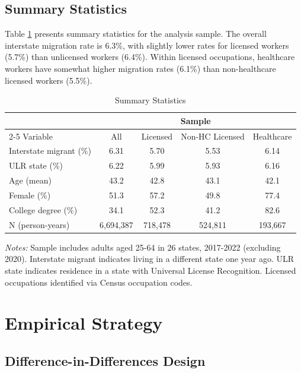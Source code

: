 \documentclass[12pt]{article}
\begin{document}
\subsection{Summary Statistics}

Table \ref{tab:summary} presents summary statistics for the analysis sample. The overall interstate migration rate is 6.3\%, with slightly lower rates for licensed workers (5.7\%) than unlicensed workers (6.4\%). Within licensed occupations, healthcare workers have somewhat higher migration rates (6.1\%) than non-healthcare licensed workers (5.5\%).

\begin{table}[H]
\centering
\caption{Summary Statistics}
\begin{tabular}{lcccc}
\toprule
& \multicolumn{4}{c}{Sample} \\
\cmidrule(lr){2-5}
Variable & All & Licensed & Non-HC Licensed & Healthcare \\
\midrule
Interstate migrant (\%) & 6.31 & 5.70 & 5.53 & 6.14 \\
ULR state (\%) & 6.22 & 5.99 & 5.93 & 6.16 \\
Age (mean) & 43.2 & 42.8 & 43.1 & 42.1 \\
Female (\%) & 51.3 & 57.2 & 49.8 & 77.4 \\
College degree (\%) & 34.1 & 52.3 & 41.2 & 82.6 \\
\midrule
N (person-years) & 6,694,387 & 718,478 & 524,811 & 193,667 \\
\bottomrule
\end{tabular}

\vspace{0.5em}
\footnotesize
\textit{Notes:} Sample includes adults aged 25-64 in 26 states, 2017-2022 (excluding 2020). Interstate migrant indicates living in a different state one year ago. ULR state indicates residence in a state with Universal License Recognition. Licensed occupations identified via Census occupation codes.
\label{tab:summary}
\end{table}

\section{Empirical Strategy}

\subsection{Difference-in-Differences Design}
\end{document}
